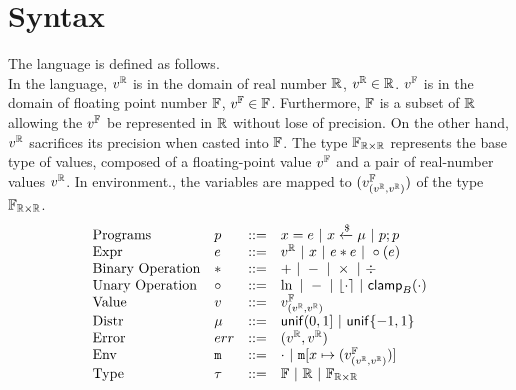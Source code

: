 \documentclass[a4paper,11pt]{article}
\begin{document}
\section{Syntax}
The language is defined as follows.
\\
In the language, $v^{\mathbb{R}}$ is in the domain of real number $\mathbb{R}$, $v^{\mathbb{R}} \in \mathbb{R}$. 
$v^{\mathbb{F}}$ is in the domain of floating point number $\mathbb{F}$, $v^{\mathbb{F}} \in \mathbb{F}$. 
Furthermore, $\mathbb{F}$ is a subset of $\mathbb{R}$ allowing the $v^{\mathbb{F}}$ be represented in $\mathbb{R}$ without lose of precision. 
On the other hand, $v^{\mathbb{R}}$ sacrifices its precision when casted into $\mathbb{F}$.
The type $\mathbb{F}_{\mathbb{R} \times \mathbb{R}}$ represents the base type of values, composed of a floating-point value $v^{\mathbb{F}}$ and a pair of real-number values $v^{\mathbb{R}}$.
In environment., the variables are mapped to $(v^{\mathbb{F}}_{(v^{\mathbb{R}}, v^{\mathbb{R}})})$ of the type $\mathbb{F}_{\mathbb{R} \times \mathbb{R}}$.
%
\[\begin{array}{llll}
\mbox{Programs} & \prog & ::= & 
     \varx = \expr ~|~ \varx \samplel \edistr
	~|~ \prog ; \prog \\

\mbox{Expr} & \expr & ::= & \rval
	~|~ \varx  ~|~ \expr \bop \expr
	~|~ \uop (\expr) \\
%
\mbox{Binary Operation} & \bop & ::= & + ~|~ - ~|~ \times ~|~ \div \\
%
\mbox{Unary Operation} & \uop & ::= & \ln ~|~ - ~|~ \round{\cdot} 
	~|~ \clamp_B(\cdot) \\
%
\mbox{Value} & \valv & ::= & \fval_{(\rval, \rval)}\\
%
\mbox{Distr} & \edistr & ::= & \uniform(0, 1]
%
	~|~ \uniform\{-1, 1\}\\ 
%
\mbox{Error} & \err & ::= & (\rval, \rval) \\
%
\mbox{Env} & \trsmem & ::= & \cdot ~|~ \trsmem[x \mapsto (\fval_{(\rval, \rval)})]\\
%
\mbox{Type} & \tau & ::= & \float ~|~ \real ~|~ \float_{\real \times \real}
\end{array}
\]


%
\end{document}
